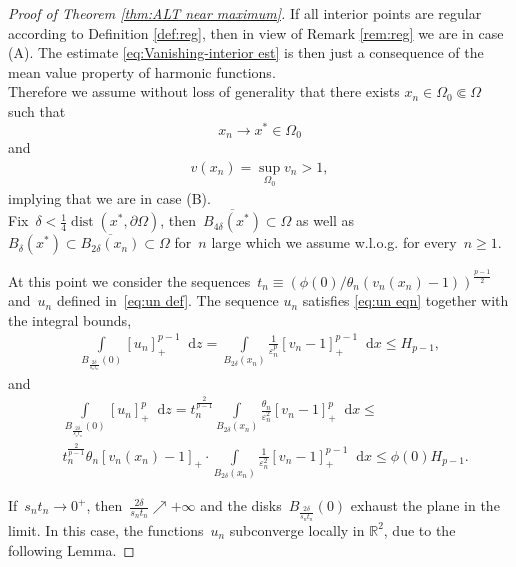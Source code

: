 \documentclass[10pt]{amsart}
\newcommand{\R}{\mathbb{R}}
\newcommand{\dd}{\mathop{}\!\mathrm{d}}
\newcommand{\eps}{\varepsilon}
\DeclareMathOperator{\dist}{dist}
\def\R{\mathbb{R}}
\renewcommand{\to}{\rightarrow}
\begin{document}
    \begin{proof}[Proof of Theorem \ref{thm:ALT near maximum}]
        If all interior points are regular according to Definition \ref{def:reg}, then in view of Remark \ref{rem:reg} we are in case (A).
        The estimate \eqref{eq:Vanishing-interior est} is then just a consequence of the mean value property of harmonic functions.\\
Therefore we assume without loss of generality that there exists $x_n\in \Omega_0\Subset \Omega$ such that
$$
x_n\to x^*\in \Omega_0
$$
and
        \begin{align}\label{4.10}
            v(x_n)=\sup_{\Omega_0} v_n >1,
        \end{align}
        implying that we are in case (B).\\
        Fix~$\delta <\frac{1}{4}\dist(x^*,\partial \Omega)$, then~$\overline{B_{4\delta}(x^*)}\subset \Omega$
        as well as~$B_\delta(x^*)\subset \overline{B_{2\delta}(x_n)}\subset\Omega$ for~$n$ large which we assume w.l.o.g.  for every~$n\geq 1$.

     At this point we consider the sequences~$t_n\equiv \left(\phi(0)/\theta_n(v_n(x_n)-1)\right)^{\frac{p-1}{2}}$ and~$u_n$ defined in~\eqref{eq:un def}.
        The sequence $u_n$ satisfies \eqref{eq:un eqn} together with the integral bounds,
        \begin{align*}
            \int\limits_{B_{\frac{2\delta}{s_n t_n}} (0)} [u_n]_+^{p-1}\dd{z}
            =\int\limits_{B_{2\delta}(x_n)} \frac{1}{\eps_n^p}[v_n-1]_+^{p-1}\dd{x}  \leq H_{p-1},
        \end{align*}
        and
        \begin{align}\nonumber
            &\int\limits_{B_{\frac{2\delta}{s_n t_n}}(0)} [u_n]_+^{p} \dd{z}
            = t_n^{\frac{2}{p-1}}\int\limits_{B_{2\delta}(x_n)} \frac{\theta_n}{\eps_n^2} [v_n -1 ]_+^{p}\dd{x} \leq\\
      \label{intboundp}      &t_n^{\frac{2}{p-1}}\theta_n[v_n(x_n)-1]_+ \cdot \int\limits_{B_{2\delta}(x_n)} \frac{1}{\eps_n^2}[v_n-1]_+^{p-1}\dd{x}
            \leq \phi(0)H_{p-1}.
        \end{align}

        If~$s_n t_n \to 0^+$, then~$\frac{2\delta}{s_n t_n}\nearrow +\infty$ and the disks~$B_{\frac{2\delta}{s_n t_n}}(0)$ exhaust the plane in the limit.
        In this case, the functions~$u_n$ subconverge locally in $\R^2$, due to the following Lemma.



\end{proof}
\end{document}
